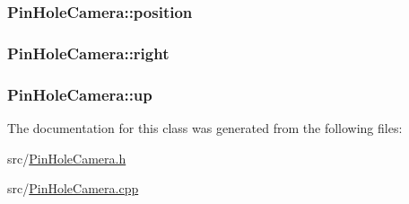 \subsubsection[{\texorpdfstring{position}{position}}]{ Pin\+Hole\+Camera\+::position\hspace{0.3cm}{\ttfamily [private]}}\hypertarget{classPinHoleCamera_ad70cef45e6269877a9fe6b6724fcdb2f}{}\label{classPinHoleCamera_ad70cef45e6269877a9fe6b6724fcdb2f}
\subsubsection[{\texorpdfstring{right}{right}}]{ Pin\+Hole\+Camera\+::right\hspace{0.3cm}{\ttfamily [private]}}\hypertarget{classPinHoleCamera_a0e235a4cb8cc58ecfa7a2483ea11398e}{}\label{classPinHoleCamera_a0e235a4cb8cc58ecfa7a2483ea11398e}
\subsubsection[{\texorpdfstring{up}{up}}]{ Pin\+Hole\+Camera\+::up\hspace{0.3cm}{\ttfamily [private]}}\hypertarget{classPinHoleCamera_a25b1d519b4b7e74942f120aac1f067a9}{}\label{classPinHoleCamera_a25b1d519b4b7e74942f120aac1f067a9}


The documentation for this class was generated from the following files\+:\begin{DoxyCompactItemize}
\item 
src/\hyperlink{PinHoleCamera_8h}{Pin\+Hole\+Camera.\+h}\item 
src/\hyperlink{PinHoleCamera_8cpp}{Pin\+Hole\+Camera.\+cpp}\end{DoxyCompactItemize}
